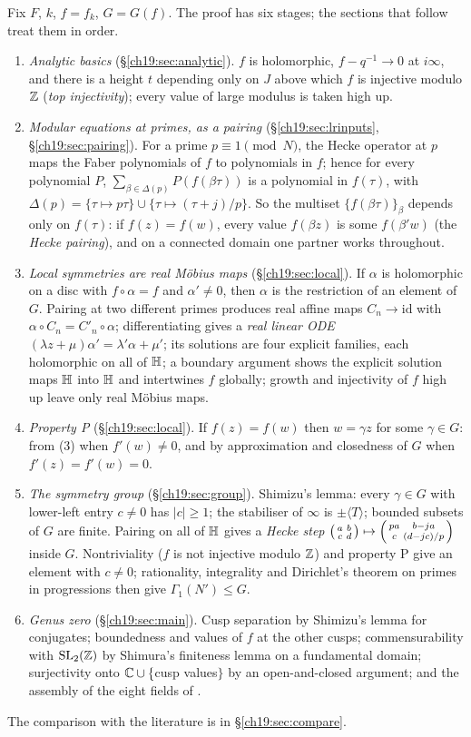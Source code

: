 Fix $F$, $k$, $f=f_k$, $G=G(f)$.  The proof has six stages; the sections that follow treat them in order.
\begin{enumerate}[label=(\arabic*)]
\item \emph{Analytic basics} (\S\ref{ch19:sec:analytic}).  $f$ is holomorphic, $f-q^{-1}\to0$ at $i\infty$, and there is a height
  $t$ depending only on $J$ above which $f$ is injective modulo ${\mathbb{Z}}$ (\emph{top injectivity}); every value of large modulus is
  taken high up.
\item \emph{Modular equations at primes, as a pairing} (\S\ref{ch19:sec:lrinputs}, \S\ref{ch19:sec:pairing}).  For a prime
  $p\equiv1\pmod N$, the Hecke operator at $p$ maps the Faber polynomials of $f$ to polynomials in $f$; hence for every
  polynomial $P$, $\sum_{\beta\in\Delta(p)}P(f(\beta\tau))$ is a polynomial in $f(\tau)$, with $\Delta(p)=\{\tau\mapsto p\tau\}\cup
  \{\tau\mapsto(\tau+j)/p\}$.  So the multiset $\{f(\beta\tau)\}_\beta$ depends only on $f(\tau)$: if $f(z)=f(w)$, every value
  $f(\beta z)$ is some $f(\beta'w)$ (the \emph{Hecke pairing}), and on a connected domain one partner works throughout.
\item \emph{Local symmetries are real M\"obius maps} (\S\ref{ch19:sec:local}).  If $\alpha$ is holomorphic on a disc with
  $f\circ\alpha=f$ and $\alpha'\ne0$, then $\alpha$ is the restriction of an element of $G$.  Pairing at two different primes
  produces real affine maps $C_n\to\mathrm{id}$ with $\alpha\circ C_n=C'_n\circ\alpha$; differentiating gives a \emph{real linear ODE}
  $(\lambda z+\mu)\alpha'=\lambda'\alpha+\mu'$; its solutions are four explicit families, each holomorphic on all of $\mathbb{H}$; a
  boundary argument shows the explicit solution maps $\mathbb{H}$ into $\mathbb{H}$ and intertwines $f$ globally; growth and
  injectivity of $f$ high up leave only real M\"obius maps.
\item \emph{Property P} (\S\ref{ch19:sec:local}).  If $f(z)=f(w)$ then $w=\gamma z$ for some $\gamma\in G$: from (3) when $f'(w)\ne0$,
  and by approximation and closedness of $G$ when $f'(z)=f'(w)=0$.
\item \emph{The symmetry group} (\S\ref{ch19:sec:group}).  Shimizu's lemma: every $\gamma\in G$ with lower-left entry $c\ne0$ has
  $|c|\ge1$; the stabiliser of $\infty$ is $\pm\langle T\rangle$; bounded subsets of $G$ are finite.  Pairing on all of $\mathbb{H}$
  gives a \emph{Hecke step} $\left(\begin{smallmatrix}a&b\\c&d\end{smallmatrix}\right)\mapsto\left(\begin{smallmatrix}pa&b-ja\\c&(d-jc)/p\end{smallmatrix}\right)$ inside $G$.  Nontriviality ($f$ is not injective
  modulo ${\mathbb{Z}}$) and property P give an element with $c\ne0$; rationality, integrality and Dirichlet's theorem on primes in
  progressions then give $\Gamma_1(N')\le G$.
\item \emph{Genus zero} (\S\ref{ch19:sec:main}).  Cusp separation by Shimizu's lemma for conjugates; boundedness and values
  of $f$ at the other cusps; commensurability with $\mathrm{SL}_2(\mathbb{Z})$ by Shimura's finiteness lemma on a fundamental domain;
  surjectivity onto ${\mathbb{C}}\cup\{$cusp values$\}$ by an open-and-closed argument; and the assembly of the eight fields of
  .
\end{enumerate}
The comparison with the literature is in \S\ref{ch19:sec:compare}.

